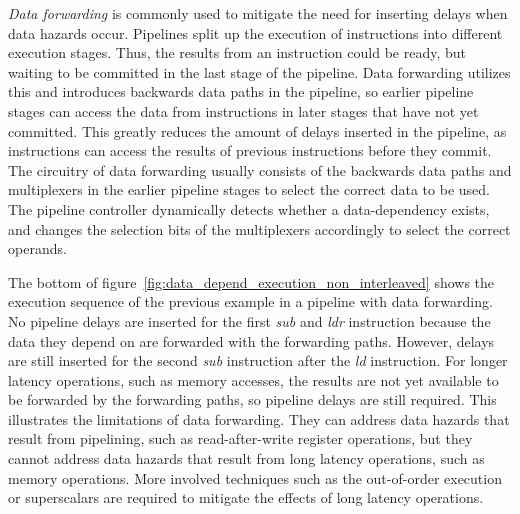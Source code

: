\emph{Data forwarding} is commonly used to mitigate the need for inserting delays when data hazards occur.
Pipelines split up the execution of instructions into different execution stages. 
Thus, the results from an instruction could be ready, but waiting to be committed in the last stage of the pipeline.
Data forwarding utilizes this and introduces backwards data paths in the pipeline, so earlier pipeline stages can access the data from instructions in later stages that have not yet committed.
This greatly reduces the amount of delays inserted in the pipeline, as instructions can access the results of previous instructions before they commit.
The circuitry of data forwarding usually consists of the backwards data paths and multiplexers in the earlier pipeline stages to select the correct data to be used.    
The pipeline controller dynamically detects whether a data-dependency exists, and changes the selection bits of the multiplexers accordingly to select the correct operands.

The bottom of figure~\ref{fig:data_depend_execution_non_interleaved} shows the execution sequence of the previous example in a pipeline with data forwarding.
No pipeline delays are inserted for the first \emph{sub} and \emph{ldr} instruction because the data they depend on are forwarded with the forwarding paths.
However, delays are still inserted for the second \emph{sub} instruction after the \emph{ld} instruction.
For longer latency operations, such as memory accesses, the results are not yet available to be forwarded by the forwarding paths, so pipeline delays are still required. 
This illustrates the limitations of data forwarding.
They can address data hazards that result from pipelining, such as read-after-write register operations, but they cannot address data hazards that result from long latency operations, such as memory operations.
More involved techniques such as the out-of-order execution or superscalars are required to mitigate the effects of long latency operations.

